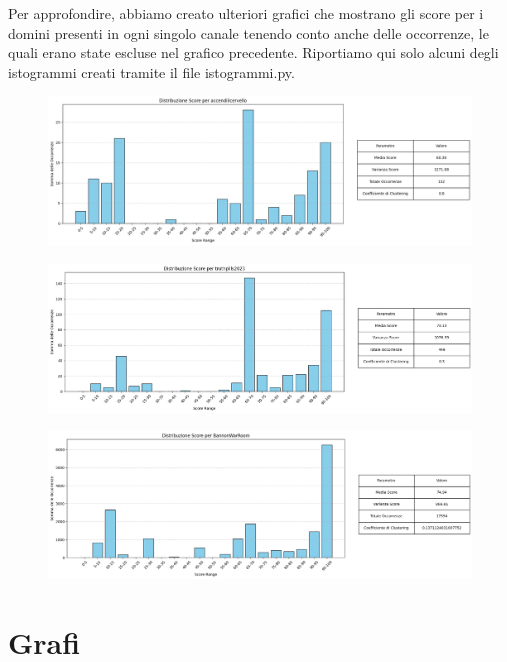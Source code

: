 \documentclass[12pt]{article}
\begin{document}
	Per approfondire, abbiamo creato ulteriori grafici che mostrano gli score per i domini presenti in ogni singolo canale tenendo conto anche delle occorrenze, le quali erano state escluse nel grafico precedente. Riportiamo qui solo alcuni degli istogrammi creati tramite il file istogrammi.py.
	
	\begin{figure}[H]
		\centering
		\includegraphics[width=1.1\textwidth]{immagini/accendiilcervello}
	\end{figure}
	
	\begin{figure}[H]
		\centering
		\includegraphics[width=1.1\textwidth]{immagini/truthpills2023}
	\end{figure}
	
	\begin{figure}[H]
		\centering
		\includegraphics[width=1.1\textwidth]{immagini/BannonWarRoom}
	\end{figure}
	
	\newpage
	\section{Grafi}
\end{document}
